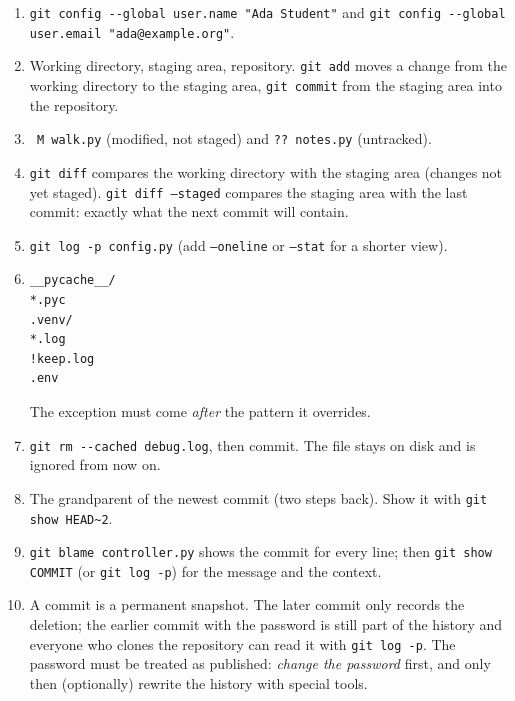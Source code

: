 \begin{enumerate}[label=\textbf{\ansnum.\arabic*}]
  \item \verb!git config --global user.name "Ada Student"! and \verb!git config --global user.email "ada@example.org"!.
  \item Working directory, staging area, repository. \texttt{git add} moves a change from the working directory to the staging area, \texttt{git commit} from the staging area into the repository.
  \item \texttt{\ M walk.py} (modified, not staged) and \texttt{?? notes.py} (untracked).
  \item \texttt{git diff} compares the working directory with the staging area (changes not yet staged). \texttt{git diff --staged} compares the staging area with the last commit: exactly what the next commit will contain.
  \item \verb!git log -p config.py! (add \texttt{--oneline} or \texttt{--stat} for a shorter view).
  \item
\begin{verbatim}
__pycache__/
*.pyc
.venv/
*.log
!keep.log
.env
\end{verbatim}
  The exception must come \emph{after} the pattern it overrides.
  \item \verb!git rm --cached debug.log!, then commit. The file stays on disk and is ignored from now on.
  \item The grandparent of the newest commit (two steps back). Show it with \verb!git show HEAD~2!.
  \item \verb!git blame controller.py! shows the commit for every line; then \verb!git show COMMIT! (or \texttt{git log -p}) for the message and the context.
  \item[\textbf{\ansnum.10}] A commit is a permanent snapshot. The later commit only records the deletion; the earlier commit with the password is still part of the history and everyone who clones the repository can read it with \texttt{git log -p}. The password must be treated as published: \emph{change the password} first, and only then (optionally) rewrite the history with special tools.
\end{enumerate}
